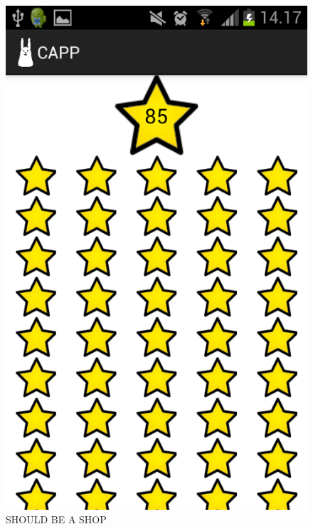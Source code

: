 \begin{figure}
\begin{minipage}[b]{0.4\linewidth}
			\includegraphics[width=0.20\paperwidth]{Pictures/app-screenshots/capp_stars.png}
		\caption{SHOULD BE A SHOP}
		\label{fig:capp_store}
	\end{minipage} 
\end{figure}
% 
